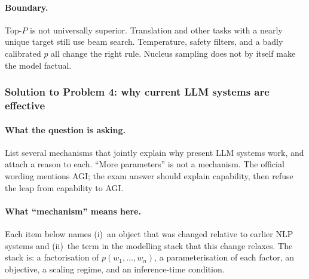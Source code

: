 \documentclass[11pt,a4paper]{article}
\theoremstyle{definition}
\begin{document}
\paragraph{Boundary.}
Top-\(P\) is not universally superior. Translation and other tasks with a nearly unique target still use beam search. Temperature, safety filters, and a badly calibrated \(p\) all change the right rule. Nucleus sampling does not by itself make the model factual.

\subsubsection{Solution to Problem 4: why current LLM systems are effective}

\paragraph{What the question is asking.}
List several mechanisms that jointly explain why present LLM systems work, and attach a reason to each. ``More parameters'' is not a mechanism. The official wording mentions AGI; the exam answer should explain capability, then refuse the leap from capability to AGI.

\paragraph{What ``mechanism'' means here.}
Each item below names (i)~an object that was changed relative to earlier NLP systems and (ii)~the term in the modelling stack that this change relaxes. The stack is: a factorisation of \(p(w_1,\ldots,w_n)\), a parameterisation of each factor, an objective, a scaling regime, and an inference-time condition.
\end{document}
